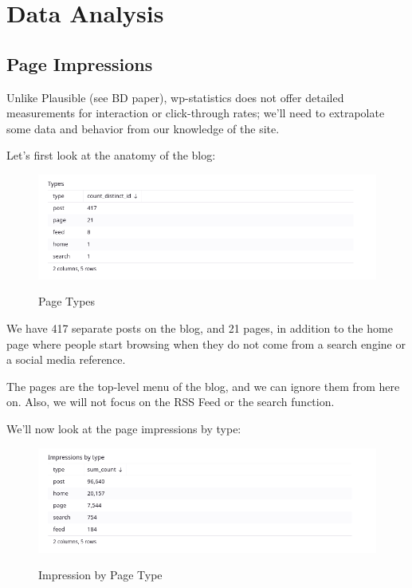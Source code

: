 %
%

\pagebreak
\section{Data Analysis}

\onehalfspacing

\subsection{Page Impressions}

Unlike Plausible (see BD paper), wp-statistics does not offer detailed measurements for interaction or click-through rates; we'll need to extrapolate some data and behavior from our knowledge of the site.

Let's first look at the anatomy of the blog:

\begin{figure}[H]
\centering
\caption {Page Types}
\includegraphics[width=\linewidth]{images/figure10.png}
\label{fig:pageTypes}
\end{figure}

We have 417 separate posts on the blog, and 21 pages, in addition to the home page where people start browsing when they do not come from a search engine or a social media reference. 

The pages are the top-level menu of the blog, and we can ignore them from here on. Also, we will not focus on the RSS Feed or the search function.

We'll now look at the page impressions by type:

\begin{figure}[H]
\centering
\caption {Impression by Page Type}
\includegraphics[width=\linewidth]{images/figure11.png}
\label{fig:impressionType}
\end{figure}

